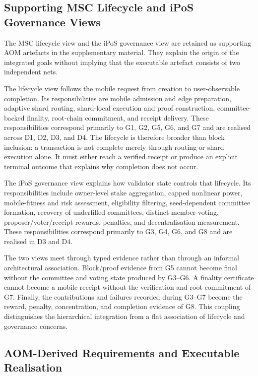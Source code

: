 \documentclass[a4paper,fleqn]{cas-sc}
\begin{document}
\subsection{Supporting MSC Lifecycle and iPoS Governance Views}
\label{subsec:supporting_goal_views}

The MSC lifecycle view and the iPoS governance view are retained as supporting
AOM artefacts in the supplementary material. They explain the origin of the
integrated goals without implying that the executable artefact consists of two
independent nets.

The lifecycle view follows the mobile request from creation to user-observable
completion. Its responsibilities are mobile admission and edge preparation,
adaptive shard routing, shard-local execution and proof construction,
committee-backed finality, root-chain commitment, and receipt delivery. These
responsibilities correspond primarily to G1, G2, G5, G6, and G7 and are
realised across D1, D2, D3, and D4. The lifecycle is therefore broader than
block inclusion: a transaction is not complete merely through routing or shard execution alone. It must either reach a verified receipt or produce an
explicit terminal outcome that explains why completion does not occur.

The iPoS governance view explains how validator state controls that lifecycle.
Its responsibilities include owner-level stake aggregation, capped nonlinear
power, mobile-fitness and risk assessment, eligibility filtering, seed-dependent
committee formation, recovery of underfilled committees, distinct-member
voting, proposer/voter/receipt rewards, penalties, and decentralisation
measurement. These responsibilities correspond primarily to G3, G4, G6, and
G8 and are realised in D3 and D4.

The two views meet through typed evidence rather than through an informal
architectural association. Block/proof evidence from G5 cannot become final
without the committee and voting state produced by G3--G6. A finality
certificate cannot become a mobile receipt without the verification and root
commitment of G7. Finally, the contributions and failures recorded during
G3--G7 become the reward, penalty, concentration, and completion evidence of
G8. This coupling distinguishes the hierarchical integration from a flat association of lifecycle and governance concerns.

\subsection{AOM-Derived Requirements and Executable Realisation}
\label{subsec:reqs}
\end{document}
